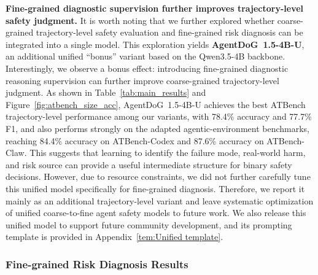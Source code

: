 \documentclass{llmxive}
\providecommand{\agentdog}{AgentDoG~1.5\xspace}
\begin{document}
\textbf{Fine-grained diagnostic supervision further improves trajectory-level safety judgment.}
It is worth noting that we further explored whether coarse-grained
trajectory-level safety evaluation and fine-grained risk diagnosis can be
integrated into a single model. This exploration yields
\textbf{\agentdog{}-4B-U}, an additional unified ``bonus'' variant based on the
Qwen3.5-4B backbone. Interestingly, we observe a bonus effect: introducing
fine-grained diagnostic reasoning supervision can further improve coarse-grained
trajectory-level judgment. As shown in Table~\ref{tab:main_results} and
Figure~\ref{fig:atbench_size_acc}, \agentdog{}-4B-U achieves the best
ATBench trajectory-level performance among our variants, with 78.4\%
accuracy and 77.7\% F1, and also performs strongly on the adapted
agentic-environment benchmarks, reaching 84.4\% accuracy on ATBench-Codex
and 87.6\% accuracy on ATBench-Claw. This suggests that
learning to identify the failure mode, real-world harm, and risk source can
provide a useful intermediate structure for binary safety decisions. However, due to resource constraints, we did not further carefully tune this unified model
specifically for fine-grained diagnosis. Therefore, we report it mainly as
an additional trajectory-level variant and leave systematic optimization of
unified coarse-to-fine agent safety models to future work. We also release this unified model
to support future community development, and its prompting template is provided
in Appendix~\ref{tem:Unified template}.

\subsubsection{Fine-grained Risk Diagnosis Results}
\end{document}
